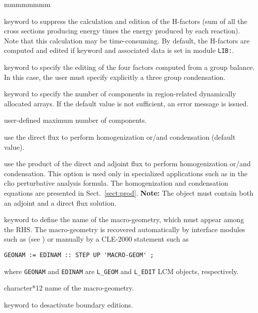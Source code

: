 \begin{ListeDeDescription}{mmmmmmmm}
\item[\moc{NOHF}] keyword to suppress the calculation and edition of the H-factors (sum of all
the cross sections producing energy times the energy produced by each reaction).
Note that this calculation may be time-consuming. By default, the H-factors are
computed and edited if keyword  and associated data is set in module {\tt LIB:}.

\item[\moc{NBAL}] keyword to specify the editing of the four factors computed
from a group balance. In this case, the user must specify explicitly a three
group condensation.

\item[\moc{MAXR}] keyword to specify the number of components in
region-related dynamically allocated arrays. If the default value is
not sufficient, an error message is issued.

\item[\dusa{maxpts}] user-defined maximum number of components.

\item[\moc{DIRE}] use the direct flux to perform homogenization or/and
condensation (default value).

\item[\moc{PROD}] use the product of the direct and adjoint flux to perform homogenization or/and
condensation. This option is used only in specialized applications such as in the {\sc clio} perturbative
analysis formula.\cite{clio} The homogenization and condensation equations are presented in Sect.~\ref{sect:prod}.
{\bf Note:} The  object must contain both an adjoint and a direct flux solution.

\item[\moc{MGEO}] keyword to define the name of the macro-geometry, which must appear among the RHS. The macro-geometry is recovered automatically
by interface modules such as  (see ) or manually by a CLE-2000 statement such as
\begin{verbatim}
GEONAM := EDINAM :: STEP UP 'MACRO-GEOM' ;
\end{verbatim}
\noindent where {\tt GEONAM} and {\tt EDINAM} are {\tt L\_GEOM} and {\tt L\_EDIT} LCM objects, respectively.

\item[\dusa{MACGEO}] character*12 name of the macro-geometry.

\item[\moc{NADF}] keyword to desactivate boundary editions.


\end{ListeDeDescription}

